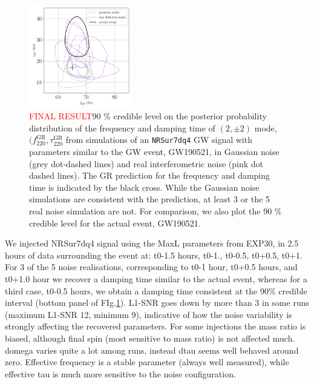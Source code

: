 \documentclass[twocolumn,prd,superscriptaddress,amsfonts,amssymb,amsmath,preprintnumbers]{revtex4-1}
\newcommand{\fgr}[1]{f ^{\text{GR}}_{\text{#1}}}
\newcommand{\taugr}[1]{\tau ^{\text{GR}}_{\text{#1}}}
\begin{document}
\begin{figure}
	\includegraphics[width=0.4\textwidth]{figures/S190521g_swinjs.png}
	\caption{\textcolor{red}{FINAL RESULT}90 \% credible level on the posterior probability distribution of the frequency and damping time of $(2,\pm 2)$ mode, $(\fgr{220}, \taugr{220}$ from simulations of an \texttt{NRSur7dq4} GW signal with parameters similar to the GW event, GW190521, in Gaussian noise (grey dot-dashed lines) and real interferometric noise (pink dot dashed lines). The GR prediction for the frequency and damping time is indicated by the black cross. While the Gaussian noise simulations are consistent with the prediction, at least 3 or the 5 real noise simulation are not. For comparison, we also plot the 90 \% credible level for the actual event, GW190521.}
	\label{fig:21g_systematics}
\end{figure}

We injected NRSur7dq4 signal using the MaxL parameters from EXP30, in 2.5 hours of data surrounding the event at: t0-1.5 hours, t0-1., t0-0.5, t0+0.5, t0+1. For 3 of the 5 noise realisations, corresponding to t0-1 hour, t0+0.5 hours, and t0+1.0 hour we recover a damping time similar to the actual event, whereas for a third case, t0-0.5 hours, we obtain a damping time consistent at the 90\% credible interval (bottom panel of FIg.\ref{fig:21g_systematics}). L1-SNR goes down by more than 3 in some runs (maximum L1-SNR 12, minimum 9), indicative of how the noise variability is strongly affecting the recovered parameters. For some injections the mass ratio is biased, although final spin (most sensitive to mass ratio) is not affected much.  domega varies quite a lot among runs, instead dtau seems well behaved around zero. Effective frequency is a stable parameter (always well measured), while effective tau is much more sensitive to the noise configuration.  
\end{document}
